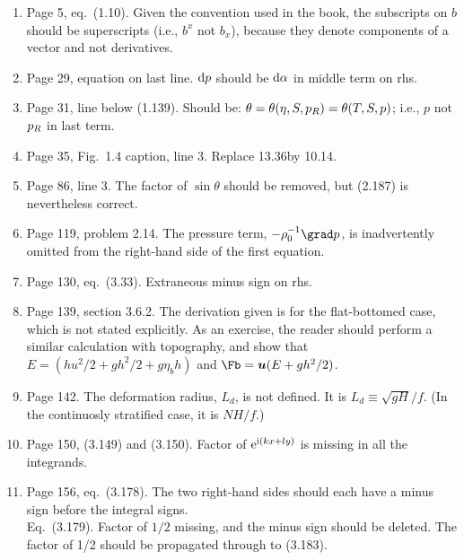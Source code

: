 \documentclass[10pt]{article}
\newcommand{\eq}{eq.\ } \newcommand{\Eq}{Eq.\ }
\begin{document}
\begin{enumerate}

\item Page 5, \eq (1.10).  Given the  convention used in the book, the subscripts on $b$ should be superscripts (i.e., $b^x$ not $b_x$), because they denote components of a vector and not derivatives. 

\item Page 29, equation on last line. $\mathrm{d} p$ should be $\mathrm{d} \alpha$ in middle term on rhs.

\item Page 31, line below (1.139). Should be: $\theta = \theta(\eta, S, p_{R}) = \theta (T, S, p)$; i.e., $p$ not $p_{R}$ in last term.

\item Page 35, Fig.\ 1.4 caption, line 3. Replace 13.36\dgc by 10.14\dgc. 

\item Page 86, line 3. The factor of $\sin \theta$ should be removed, but (2.187) is nevertheless correct.

\item Page 119, problem 2.14. The pressure term, $-\ro^{-1} \grad p$, is inadvertently omitted from the right-hand side of the first equation. 

\item Page 130, \eq (3.33). Extraneous minus sign on rhs.

\item Page 139, section 3.6.2. The derivation given is for the flat-bottomed case, which is not stated explicitly. As an exercise, the reader should perform a similar calculation with topography, and show that $E = (h u^2/2 + g h^2/2 + g \eta_b h)$ and $\Fb = \ub( E + g h^2/2)$.  

\item Page 142. The deformation radius, $L_d$, is not defined. It is $L_d \equiv \sqrt{gH}/f$. (In the continuosly stratified case, it is $NH/f$.)

\item Page 150, (3.149) and (3.150). Factor of $\mathrm{e}^{\mathrm{i} (kx + ly)}$ is missing in all the integrands. 

\item Page 156, \eq (3.178). The two right-hand sides should each have a minus sign before the integral signs. \\
\Eq (3.179). Factor of $1/2$ missing, and the minus sign should be deleted. The factor of 1/2 should be propagated through to (3.183). 


\end{enumerate}
\end{document}
